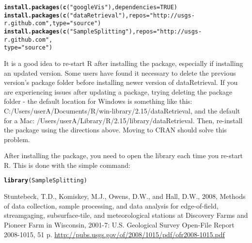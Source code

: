 \documentclass[a4paper,11pt]{article}\usepackage[]{graphicx}\usepackage[]{color}
\makeatletter
\newcommand{\hlnum}[1]{\textcolor[rgb]{0.686,0.059,0.569}{#1}}%
\newcommand{\hlstr}[1]{\textcolor[rgb]{0.192,0.494,0.8}{#1}}%
\newcommand{\hlstd}[1]{\textcolor[rgb]{0.345,0.345,0.345}{#1}}%
\newcommand{\hlkwc}[1]{\textcolor[rgb]{0.333,0.667,0.333}{#1}}%
\newcommand{\hlkwd}[1]{\textcolor[rgb]{0.737,0.353,0.396}{\textbf{#1}}}%
\newenvironment{kframe}{%
 \def\at@end@of@kframe{}%
 \ifinner\ifhmode%
  \def\at@end@of@kframe{\end{minipage}}%
  \begin{minipage}{\columnwidth}%
 \fi\fi%
 \def\FrameCommand##1{\hskip\@totalleftmargin \hskip-\fboxsep
 \colorbox{shadecolor}{##1}\hskip-\fboxsep
     \hskip-\linewidth \hskip-\@totalleftmargin \hskip\columnwidth}%
 \MakeFramed {\advance\hsize-\width
   \@totalleftmargin\z@ \linewidth\hsize
   \@setminipage}}%
 {\par\unskip\endMakeFramed%
 \at@end@of@kframe}
\newenvironment{knitrout}{}{} %
\makeatother
\begin{document}
\begin{knitrout}
\color{fgcolor}\begin{kframe}
\begin{alltt}
\hlkwd{install.packages}\hlstd{(}\hlkwd{c}\hlstd{(}\hlstr{"googleVis"}\hlstd{),} \hlkwc{dependencies}\hlstd{=}\hlnum{TRUE}\hlstd{)}
\hlkwd{install.packages}\hlstd{(}\hlkwd{c}\hlstd{(}\hlstr{"dataRetrieval"}\hlstd{),} \hlkwc{repos}\hlstd{=}\hlstr{"http://usgs-r.github.com"}\hlstd{,}\hlkwc{type}\hlstd{=}\hlstr{"source"}\hlstd{)}
\hlkwd{install.packages}\hlstd{(}\hlkwd{c}\hlstd{(}\hlstr{"SampleSplitting"}\hlstd{),}\hlkwc{repos}\hlstd{=}\hlstr{"http://usgs-r.github.com"}\hlstd{,}
                 \hlkwc{type}\hlstd{=}\hlstr{"source"}\hlstd{)}
\end{alltt}
\end{kframe}
\end{knitrout}

It is a good idea to re-start R after installing the package, especially if installing an updated version. Some users have found it necessary to delete the previous version's package folder before installing newer version of dataRetrieval. If you are experiencing issues after updating a package, trying deleting the package folder - the default location for Windows is something like this: C:/Users/userA/Documents/R/win-library/2.15/dataRetrieval, and the default for a Mac: 
/Users/userA/Library/R/2.15/library/dataRetrieval. Then, re-install the package using the directions above. Moving to CRAN should solve this problem.

After installing the package, you need to open the library each time you re-start R.  This is done with the simple command:
\begin{knitrout}
\color{fgcolor}\begin{kframe}
\begin{alltt}
\hlkwd{library}\hlstd{(SampleSplitting)}
\end{alltt}
\end{kframe}
\end{knitrout}

\clearpage

\begin{thebibliography}{10}

Stuntebeck, T.D., Komiskey, M.J., Owens, D.W., and Hall, D.W., 2008, Methods of data collection, sample processing, and data analysis for edge-of-field, streamgaging, subsurface-tile, and meteorological stations at Discovery Farms and Pioneer Farm in Wisconsin, 2001-7: U.S. Geological Survey Open-File Report 2008-1015, 51 p.
\url{http://pubs.usgs.gov/of/2008/1015/pdf/ofr2008-1015.pdf}

\end{thebibliography}
\end{document}
